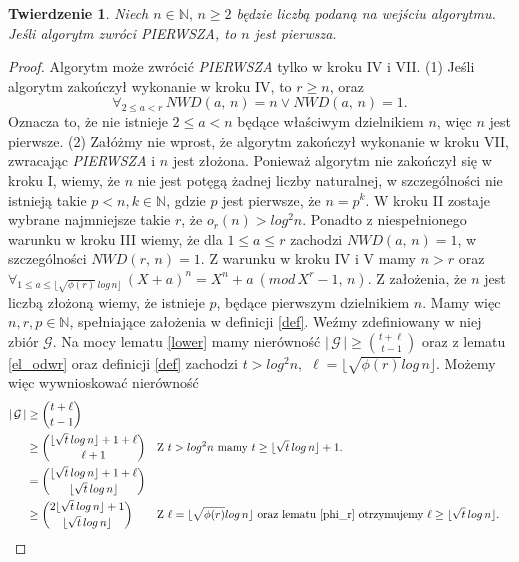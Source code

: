 \documentclass[declaration,shortabstract]{iithesis}
\theoremstyle{definition}
\theoremstyle{remark} \newtheorem{observation}{Obserwacja}
\theoremstyle{plain} \newtheorem{theorem}{Twierdzenie}
\theoremstyle{plain} \newtheorem{lemma}{Lemat}
\theoremstyle{remark} \newtheorem*{remark*}{Uwaga}
\theoremstyle{reminder} \newtheorem*{reminder*}{Przypomnienie}
\begin{document}
\begin{theorem}\label{T1}
	Niech $n \in \mathbb{N}, \, n \geq 2$ będzie liczbą podaną na wejściu algorytmu. Jeśli algorytm zwróci \textit{PIERWSZA}, to $n$ jest pierwsza.
\end{theorem}
	
\begin{proof}
	Algorytm może zwrócić \textit{PIERWSZA} tylko w kroku IV i VII. \newline
	(1) Jeśli algorytm zakończył wykonanie w kroku IV, to $r \geq n$, oraz \[\forall_{2 \leq a < r} \, NWD(a, \, n) = n \vee NWD(a, \, n) = 1.\] Oznacza to, że nie istnieje $2 \leq a < n$ będące właściwym dzielnikiem $n$, więc $n$ jest pierwsze.\newline
	(2) Załóżmy nie wprost, że algorytm zakończył wykonanie w kroku VII, zwracając \textit{PIERWSZA} i $n$ jest złożona. Ponieważ algorytm nie zakończył się w kroku I, wiemy, że $n$ nie jest potęgą żadnej liczby naturalnej, w szczególności nie istnieją takie $p < n, k \in \mathbb{N}$, gdzie $p$ jest pierwsze, że $n = p^k$. W kroku II zostaje wybrane najmniejsze takie $r$, że $o_r(n) > log^2n$. Ponadto z niespełnionego warunku w kroku III wiemy, że dla $1 \leq a \leq r$ zachodzi $NWD(a, \, n) = 1$, w szczególności $NWD(r, \, n) = 1$. Z warunku w kroku IV i V mamy $n > r$ oraz ${\forall_{1 \leq a \leq \lfloor \sqrt{\phi(r)} \, log \, n \rfloor} \, (X + a)^n = X^n + a \: (mod \, X^r - 1, \, n).}$ Z założenia, że $n$ jest liczbą złożoną wiemy, że istnieje $p$, będące pierwszym dzielnikiem $n$. Mamy więc $n, r, p \in \mathbb{N}$, spełniające założenia w definicji \ref{def}. Weźmy zdefiniowany w niej zbiór $\mathcal{G}$. Na mocy lematu \ref{lower} mamy nierówność $| \, \mathcal{G} \, | \geq {t + \ell \choose t - 1}$ oraz z lematu \ref{el_odwr} oraz definicji \ref{def} zachodzi ${t > log^2n,}$ ${\ell = \lfloor \sqrt{\phi(r)}log \, n \rfloor.}$ Możemy więc wywnioskować nierówność
	\begin{align*}
		| \, \mathcal{G} \, | &\geq {t + \ell \choose t - 1} \\
		  & \geq {\lfloor \sqrt{t}\, log \, n \rfloor + 1 + \ell \choose \ell + 1}                      &   & \text{Z ${t > log^2n}$ mamy ${t \geq \lfloor \sqrt{t}\, log \, n} \rfloor + 1$.}                                                               \\
		& = {\lfloor \sqrt{t}\, log \, n \rfloor + 1 + \ell \choose \lfloor \sqrt{t}\, log \, n \rfloor} \\
		  & \geq {2\lfloor \sqrt{t}\, log \, n \rfloor + 1 \choose \lfloor \sqrt{t}\, log \, n \rfloor} &   & \text{Z $\ell = \lfloor \sqrt{\phi(r)}log \, n \rfloor$ oraz lematu \ref{phi_r} otrzymujemy $\ell \geq \lfloor \sqrt{t} \, log \, n \rfloor$.} \\

\end{align*}
\end{proof}
\end{document}
